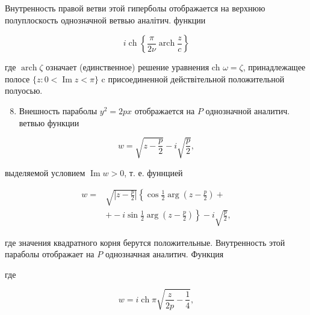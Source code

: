 \documentclass[10pt]{article}
\begin{document}
Внутренность правой ветви этой гиперболы отображается на верхнюю полуплоскость однозначной ветвью аналітич. функции



\[

i \operatorname{ch}\left\{\frac{\pi}{2 \nu} \operatorname{arch} \frac{z}{c}\right\}

\]



где $\operatorname{arch} \zeta$ означает (единственное) решение уравнения ch $\omega=\zeta$, принадлежащее полосе $\{z: 0<\operatorname{Im} z<\pi\}$ c присоединенной действітельной положительной полуосью.



\begin{enumerate}

  \setcounter{enumi}{7}

  \item Внешность параболы $y^{2}=2 p x$ отображается на $P$ однозначной аналитич. ветвью функции

\end{enumerate}



\[

w=\sqrt{z-\frac{p}{2}}-i \sqrt{\frac{p}{2}},

\]



выделяемой условием $\operatorname{Im} w>0$, т. е. фуннцией



\[

\begin{aligned}

w= & \sqrt{\left|z-\frac{p}{2}\right|}\left\{\cos \frac{1}{2} \arg \left(z-\frac{p}{2}\right)+\right. \\

& \left.+-i \sin \frac{1}{2} \arg \left(z-\frac{p}{2}\right)\right\}-i \sqrt{\frac{p}{2}},

\end{aligned}

\]



где значения квадратного корня берутся положительные. Внутренность этой параболы отображает на $P$ однозначная аналитич. Функция



где



\[

w=i \operatorname{ch} \pi \sqrt{\frac{z}{2 p}-\frac{1}{4}},

\]
\end{document}
